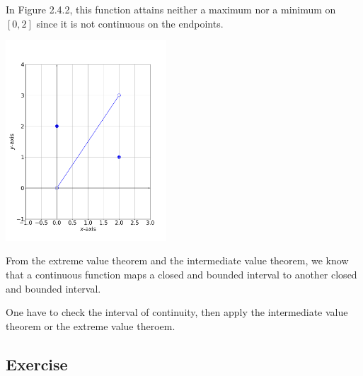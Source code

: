 \documentclass[11pt]{book}
\begin{document}
\begin{example}
    In Figure 2.4.2, this function attains neither a maximum nor a minimum on $[0, 2]$ since it is not continuous on the endpoints.
\end{example}

\begin{center}
    \includegraphics[width=0.45\textwidth]{evt.png}
\end{center}

From the extreme value theorem and the intermediate value theorem, we know that a continuous function maps a closed and bounded interval to another closed and bounded interval.

\begin{remark}
    One have to check the interval of continuity, then apply the intermediate value theorem or the extreme value theroem.
\end{remark}


\subsection*{Exercise}
\end{document}
